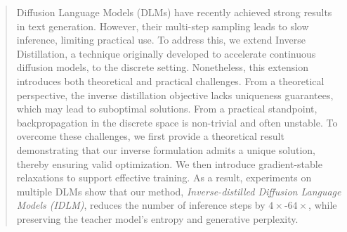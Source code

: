 \vspace{-3mm}
\begin{abstract}
  Diffusion Language Models (DLMs) have recently achieved strong results in text generation. However, their multi-step sampling leads to slow inference, limiting practical use. To address this, we extend Inverse Distillation, a technique originally developed to accelerate continuous diffusion models, to the discrete setting.
  Nonetheless, this extension introduces both theoretical and practical challenges. From a theoretical perspective, the inverse distillation objective lacks uniqueness guarantees, which may lead to suboptimal solutions. From a practical standpoint, backpropagation in the discrete space is non-trivial and often unstable. To overcome these challenges, we first provide a theoretical result demonstrating that our inverse formulation admits a unique solution, thereby ensuring valid optimization. We then introduce gradient-stable relaxations to support effective training. 
  As a result, experiments on multiple DLMs show that our method, \textit{Inverse-distilled Diffusion Language Models (IDLM)}, reduces the number of inference steps by $4 \times$-$64 \times$, while preserving the teacher model’s entropy and generative perplexity.
  \vspace{-1mm}
\end{abstract}
